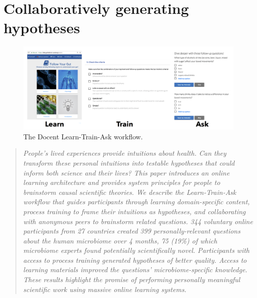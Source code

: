 \chapter{Collaboratively generating hypotheses}
\begin{figure}[h] 
  \centering
  \includegraphics[width=1.0\textwidth]{figures/docent/fig-0.png}
  \caption[The Docent Learn-Train-Ask workflow]
{The Docent Learn-Train-Ask workflow.}
  \label{fig:docent-0}
\end{figure}

\begin{quote}
\emph{People’s lived experiences provide intuitions about health.
Can they transform these personal intuitions into testable hypotheses
that could inform both science and their lives? This
paper introduces an online learning architecture and provides
system principles for people to brainstorm causal scientific
theories. We describe the Learn-Train-Ask workflow that
guides participants through learning domain-specific content,
process training to frame their intuitions as hypotheses,
and collaborating with anonymous peers to brainstorm related
questions. 344 voluntary online participants from 27
countries created 399 personally-relevant questions about the
human microbiome over 4 months, 75 (19\%) of which microbiome
experts found potentially scientifically novel. Participants
with access to process training generated
hypotheses of better quality. Access to learning materials improved
the questions’ microbiome-specific knowledge.
These results highlight the promise of performing personally 
meaningful scientific work using massive online learning
systems.}
\end{quote}
\vspace{0.25in}


